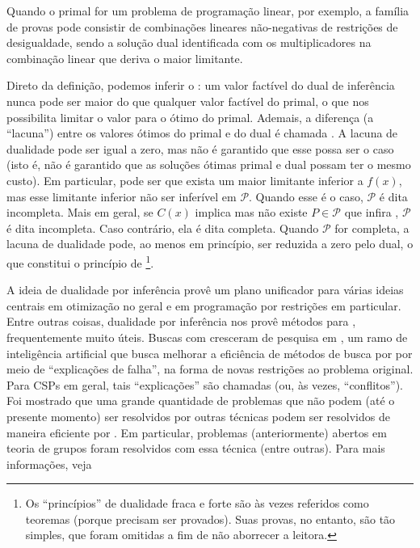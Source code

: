 \documentclass{article}
\begin{document}
Quando o primal for um problema de programação linear, por exemplo, a
família de provas pode consistir de combinações lineares não-negativas
de restrições de desigualdade, sendo a solução dual identificada com
os multiplicadores na combinação linear que deriva o maior limitante.

Direto da definição, podemos inferir o : um valor factível  do dual de inferência
nunca pode ser maior do que qualquer valor factível do primal, o que
nos possibilita limitar o valor para o ótimo do primal.  Ademais, a
diferença (a ``lacuna'') entre os valores ótimos do primal e do dual é
chamada . A lacuna de dualidade pode
ser igual a zero, mas não é garantido que esse possa ser o caso (isto
é, não é garantido que as soluções ótimas primal e dual possam ter o
mesmo custo). Em particular, pode ser que exista um maior limitante
inferior a $f(x)$, mas esse limitante inferior não ser inferível em
$\mathcal{P}$. Quando esse é o caso, $\mathcal{P}$ é dita
incompleta. Mais em geral, se $C(x)$ implica  mas não existe $P
\in \mathcal{P}$ que infira , $\mathcal{P}$ é dita
incompleta. Caso contrário, ela é dita completa. Quando $\mathcal{P}$
for completa, a lacuna de dualidade pode, ao menos em princípio, ser
reduzida a zero pelo dual, o que constitui o princípio de
\footnote{Os ``princípios'' de dualidade
  fraca e forte são às vezes referidos como teoremas (porque precisam
  ser provados). Suas provas, no entanto, são tão simples, que foram
  omitidas a fim de não aborrecer a leitora.}.

A ideia de dualidade por inferência provê um plano unificador para
várias ideias centrais em otimização no geral e em programação por
restrições em particular. Entre outras coisas, dualidade por
inferência nos provê métodos para , frequentemente muito úteis. Buscas com
 cresceram de pesquisa em
, um ramo de
inteligência artificial que busca melhorar a eficiência de métodos de
busca por  por meio de ``explicações de
falha'', na forma de novas restrições ao problema original. Para CSPs
em geral, tais ``explicações'' são chamadas  (ou, às
vezes, ``conflitos''). Foi mostrado que uma grande quantidade de
problemas que não podem (até o presente momento) ser resolvidos por
outras técnicas podem ser resolvidos de maneira eficiente por
. Em particular, problemas
(anteriormente) abertos em teoria de grupos foram resolvidos com essa
técnica (entre outras). Para mais informações, veja~\cite{beame}
\end{document}
